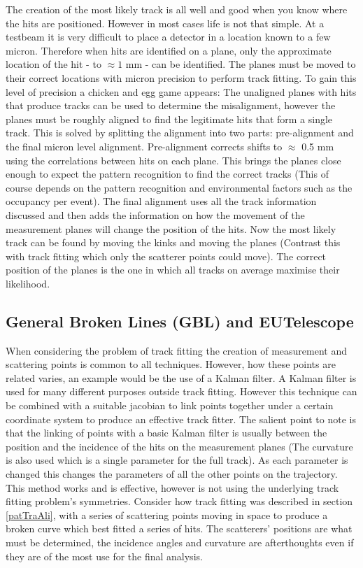 The creation of the most likely track is all well and good when you know where the hits are positioned. However in most cases life is not that simple. At a testbeam it is very difficult to place a detector in a location known to a few micron. Therefore when hits are identified on a plane, only the approximate location of the hit - to $\approx 1$ mm - can be identified. The planes must be moved to their correct locations with micron precision to perform track fitting. To gain this level of precision a chicken and egg game appears: The unaligned planes with hits that produce tracks can be used to determine the misalignment, however the planes must be roughly aligned to find the legitimate hits that form a single track. This is solved by splitting the alignment into two parts: pre-alignment and the final micron level alignment. Pre-alignment corrects shifts to $\approx$ 0.5 mm using the correlations between hits on each plane. This brings the planes close enough to expect the pattern recognition to find the correct tracks (This of course depends on the pattern recognition and environmental factors such as the occupancy per event). The final alignment uses all the track information discussed and then adds the information on how the movement of the measurement planes will change the position of the hits. Now the most likely track can be found by moving the kinks and moving the planes (Contrast this with track fitting which only the scatterer points could move). The correct position of the planes is the one in which all tracks on average maximise their likelihood.      




\subsection{General Broken Lines (GBL) and EUTelescope}
When considering the problem of track fitting the creation of measurement and scattering points is common to all techniques. However, how these points are related varies, an example would be the use of a  Kalman filter. A Kalman filter is used for many different purposes outside track fitting. However this technique can be combined with a suitable jacobian to link points together under a certain coordinate system to produce an effective track fitter. The salient point to note is that the linking of points with a basic Kalman filter is usually between the position and the incidence of the hits on the measurement planes (The curvature is also used which is a single parameter for the full track). As each parameter is changed this changes the parameters of all the other points on the trajectory. This method works and is effective, however is not using the underlying track fitting problem's symmetries. Consider how track fitting was described in section \ref{patTraAli}, with a series of scattering points moving in space to produce a broken curve which best fitted a series of hits. The scatterers' positions are what must be determined, the incidence angles and curvature are afterthoughts even if they are of the most use for the final analysis. 


